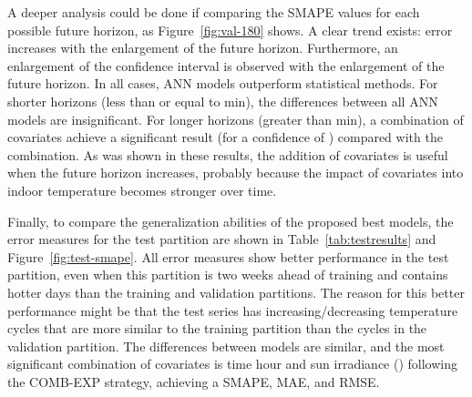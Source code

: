 \documentclass[energies,article,accept,moreauthors,pdftex,12pt,a4paper]{mdpi}
\newcommand{\ann}{ANN\xspace}
\newcommand{\comb}{COMB-EXP\xspace}
\begin{document}
A deeper analysis could be done if comparing the SMAPE values for each possible
future horizon, as Figure~\ref{fig:val-180} shows. A clear trend exists: error
increases with the enlargement of the future horizon. Furthermore, an enlargement of
the confidence interval is observed with the enlargement of the future horizon. In all
cases, \ann models outperform statistical methods. For shorter horizons (less than or
equal to  min), the differences between all \ann models are
insignificant. For longer horizons (greater than  min), a combination of
covariates  achieve a significant result (for a confidence of )
compared with the  combination. As was shown in these results, the addition
of covariates is useful when the future horizon increases, probably because the
impact of covariates into indoor temperature becomes stronger over time.

Finally, to compare the generalization abilities of the proposed best models, the error
measures for the test partition are shown in Table~\ref{tab:testresults} and
Figure~\ref{fig:test-smape}. All error measures show better
performance in the test partition, even when this partition is two weeks ahead of
training and contains hotter days than the training and validation partitions. The reason for
this better performance might be that the test series has increasing/decreasing
temperature cycles that are more similar to the training partition than the cycles in the validation partition. The
differences between models are similar, and the most significant combination of
covariates is time hour and sun irradiance () following the \comb
strategy, achieving a SMAPE, MAE,
and RMSE.
\end{document}
